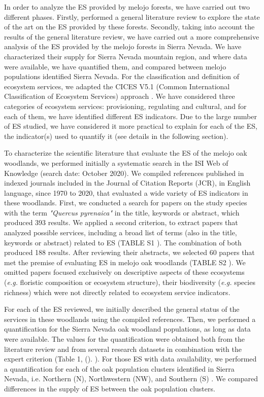 In order to analyze the ES provided by melojo forests, we have carried out two different phases. Firstly, performed a general literature review to explore the state of the art on the ES provided by these forests. Secondly, taking into account the results of the general literature review, we have carried out a more comprehensive analysis of the ES provided by the melojo forests in Sierra Nevada. We have characterized their supply for Sierra Nevada mountain region, and where data were available, we have quantified them, and compared between melojo populations identified Sierra Nevada. For the classification and definition of ecosystem services, we adapted the CICES V5.1 (Common International Classification of Ecosystem Services) approach \autocites{HainesYoungPotschin2018CommonInternational}. We have considered three categories of ecosystem services: provisioning, regulating and cultural, and for each of them, we have identified different ES indicators. Due to the large number of ES studied, we have considered it more practical to explain for each of the ES, the indicator(s) used to quantify it (see details in the following section).  

To characterize the scientific literature that evaluate the ES of the melojo oak woodlands, we performed initially a systematic search in the ISI Web of Knowledge (search date: October 2020). We compiled references published in indexed journals included in the Journal of Citation Reports (JCR), in English language, since 1970 to 2020, that evaluated a wide variety of ES indicators in these woodlands. First, we conducted a search for papers on the study species with the term \emph{"Quercus pyrenaica"} in the title, keywords or abstract, which produced 393 results. We applied a second criterion, to extract papers that analyzed possible services, including a broad list of terms (also in the title, keywords or abstract) related to ES
(TABLE S1 ). The combination of both produced 188 results. After reviewing their abstracts, we selected 60 papers that met the premise of evaluating ES in melojo oak woodlands (TABLE S2 ). We omitted papers focused exclusively on descriptive aspects of these ecosystems (\emph{e.g.} floristic composition or ecosystem structure), their biodiversity (\emph{e.g.} species richness) which were not directly related to ecosystem service indicators. 

For each of the ES reviewed, we initially described the general status of the services in these woodlands using the compiled references. Then, we performed a quantification for the Sierra Nevada oak woodland populations, as long as data were available. The values for the quantification were obtained both from the literature review and from several research datasets in combination with the expert criterion (Table 1, (). ). For those ES with data availability, we performed a quantification for each of the oak population clusters identified in Sierra Nevada, i.e. Northern (N), Northwestern (NW), and Southern (S) \autocite[ see][]{PerezLuqueetal2021EcologicalDiversity}. We compared differences in the supply of ES between the oak population clusters.

